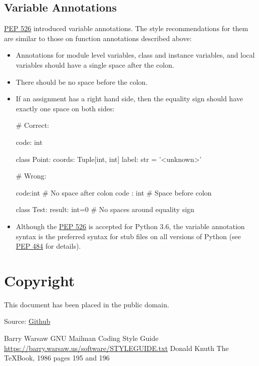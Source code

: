 \documentclass[a4paper,11pt]{article}
\begin{document}
\subsection{Variable Annotations}
\href{https://peps.python.org/pep-0526/}{PEP 526} introduced variable 
annotations. The style recommendations for them are similar to those on 
function annotations described above:
\begin{itemize}
\item Annotations for module level variables, class and instance variables, 
and local variables should have a single space after the colon.
\item There should be no space before the colon.
\item If an assignment has a right hand side, then the equality sign should 
have exactly one space on both sides:
\begin{python}
# Correct:

code: int

class Point:
    coords: Tuple[int, int]
    label: str = '<unknown>'
\end{python}
\begin{python}
# Wrong:

code:int  # No space after colon
code : int  # Space before colon

class Test:
    result: int=0  # No spaces around equality sign
\end{python}
\item Although the \href{https://peps.python.org/pep-0526/}{PEP 526} is 
accepted for Python 3.6, the variable annotation syntax is the preferred 
syntax for stub files on all versions of Python (see 
\href{https://peps.python.org/pep-0484/}{PEP 484} for details).
\end{itemize}
\section{Copyright}
This document has been placed in the public domain.
\par
Source: \href{https://github.com/python/peps/blob/main/peps/pep-0008.rst}{Github}
%
\begin{thebibliography}{000}
\newblock Barry Warsaw
\newblock GNU Mailman Coding Style Guide
\newblock \href{https://barry.warsaw.us/software/STYLEGUIDE.txt}
{https://barry.warsaw.us/software/STYLEGUIDE.txt}
\newblock Donald Knuth
\newblock The TeXBook, 1986
\newblock pages 195 and 196
\end{thebibliography}
%
\end{document}
